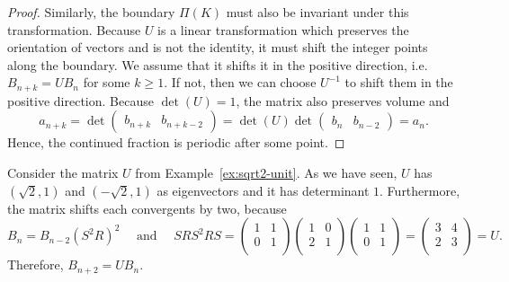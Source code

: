 \begin{proof}
  Similarly, the boundary $Π(K)$ must also be invariant under this transformation.
  Because $U$ is a linear transformation which preserves the orientation of
  vectors and is not the identity, it must shift the integer points along the
  boundary.
  We assume that it shifts it in the positive direction,
  i.e. $B_{n+k} = U B_n$ for some $k ≥ 1$.
  If not, then we can choose $U^{-1}$ to shift them in the positive direction.
  Because $\det(U) = 1$, the matrix also preserves volume and
  \[
    a_{n+k}
    = \det\begin{pmatrix}
      b_{n+k} & b_{n+k-2}
    \end{pmatrix}
    = \det(U) \det\begin{pmatrix}
      b_n & b_{n-2}
    \end{pmatrix}
    = a_n.
  \]
  Hence, the continued fraction is periodic after some point.
\end{proof}

\begin{example}
  Consider the matrix $U$ from Example~\ref{ex:sqrt2-unit}.
  As we have seen, $U$ has $(\sqrt{2}, 1)$ and $(-\sqrt{2}, 1)$ as eigenvectors
  and it has determinant $1$.
  Furthermore, the matrix shifts each convergents by two,
  because
  \[
    B_n = B_{n-2} (S^2 R)^2
    \quad
    \text{ and }
    \quad
    SRS^2RS =
    \begin{pmatrix}
      1 & 1 \\
      0 & 1 \\
    \end{pmatrix}
    \begin{pmatrix}
      1 & 0 \\
      2 & 1 \\
    \end{pmatrix}
    \begin{pmatrix}
      1 & 1 \\
      0 & 1 \\
    \end{pmatrix}
    =
    \begin{pmatrix}
      3 & 4 \\
      2 & 3 \\
    \end{pmatrix}
    = U.
  \]
  Therefore, $B_{n+2} = U B_n$.
\end{example}
